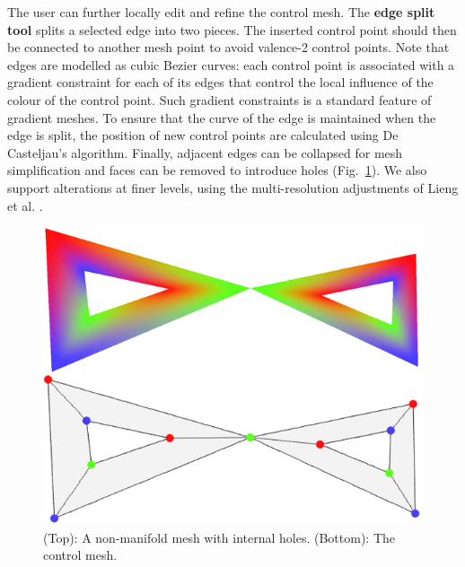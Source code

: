 \documentclass{egpubl}
\newcommand{\note}[3]{{\color{#2}\textbf{#1: #3}}}
\newcommand{\unsure}[1]{\note{USIKKER}{Green}{#1}}
\begin{document}
	The user can further locally edit and refine the control mesh. The \textbf{edge split tool} splits a selected edge into two pieces. The inserted control point should then be connected to another mesh point to avoid valence-2 control points. Note that edges are modelled as cubic Bezier curves: each control point is associated with a gradient constraint for each of its edges that control the local influence of the colour of the control point. Such gradient constraints is a standard feature of gradient meshes. To ensure that the curve of the edge is maintained when the edge is split, the position of new control points are calculated using De Casteljau's algorithm. Finally, adjacent edges can be collapsed for mesh simplification and faces can be removed to introduce holes (Fig.~\ref{fig:nonManifoldHoleMesh}). We also support alterations at finer levels, using the multi-resolution adjustments of Lieng et al. \cite{Lieng:2016}.
	
	
	\begin{figure}[t]
		\centering
		\includegraphics[height=0.25\textheight]{HoleAndNonManifoldMesh.png}
		\caption{(Top): A non-manifold mesh with internal holes. (Bottom): The control mesh.}
		\label{fig:nonManifoldHoleMesh}
	\end{figure}
	
\end{document}
